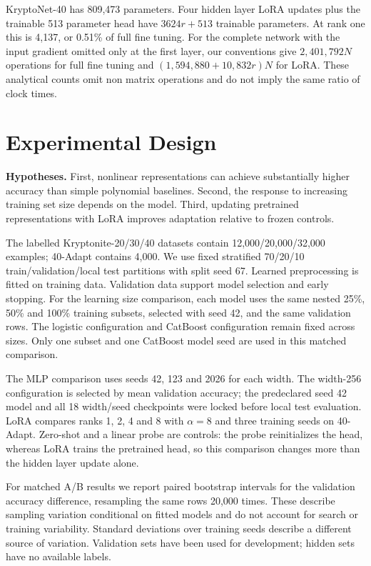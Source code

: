 \documentclass{article}
\begin{document}
KryptoNet-40 has 809,473 parameters. Four hidden layer LoRA updates plus the trainable 513 parameter head have $3624r+513$ trainable parameters. At rank one this is 4,137, or 0.51\% of full fine tuning. For the complete network with the input gradient omitted only at the first layer, our conventions give $2{,}401{,}792N$ operations for full fine tuning and $(1{,}594{,}880+10{,}832r)N$ for LoRA. These analytical counts omit non matrix operations and do not imply the same ratio of clock times.

\section{Experimental Design}
\textbf{Hypotheses.} First, nonlinear representations can achieve substantially higher accuracy than simple polynomial baselines. Second, the response to increasing training set size depends on the model. Third, updating pretrained representations with LoRA improves adaptation relative to frozen controls.

The labelled Kryptonite-20/30/40 datasets contain 12,000/20,000/32,000 examples; 40-Adapt contains 4,000. We use fixed stratified 70/20/10 train/validation/local test partitions with split seed 67. Learned preprocessing is fitted on training data. Validation data support model selection and early stopping. For the learning size comparison, each model uses the same nested 25\%, 50\% and 100\% training subsets, selected with seed 42, and the same validation rows. The logistic configuration and CatBoost configuration remain fixed across sizes. Only one subset and one CatBoost model seed are used in this matched comparison.

The MLP comparison uses seeds 42, 123 and 2026 for each width. The width-256 configuration is selected by mean validation accuracy; the predeclared seed 42 model and all 18 width/seed checkpoints were locked before local test evaluation. LoRA compares ranks 1, 2, 4 and 8 with $\alpha=8$ and three training seeds on 40-Adapt. Zero-shot and a linear probe are controls: the probe reinitializes the head, whereas LoRA trains the pretrained head, so this comparison changes more than the hidden layer update alone.

For matched A/B results we report paired bootstrap intervals for the validation accuracy difference, resampling the same rows 20,000 times. These describe sampling variation conditional on fitted models and do not account for search or training variability. Standard deviations over training seeds describe a different source of variation. Validation sets have been used for development; hidden sets have no available labels.
\end{document}

